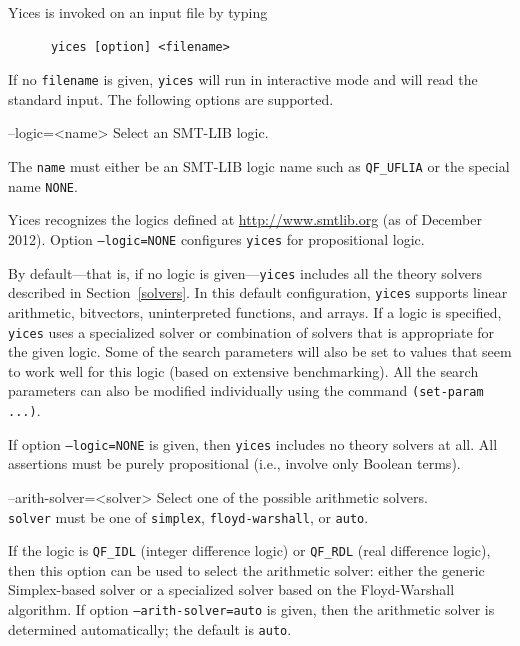 \documentclass[11pt,twoside,fleqn,openright,titlepage]{cslreport}
\newenvironment{options}{
\begin{list}{}{
\setlength{\labelsep}{1.8ex}
\setlength{\labelwidth}{0pt}
\setlength{\itemindent}{-0.5\leftmargin}
\settowidth{\leftmargin}{\texttt{--}}
\renewcommand{\makelabel}{\optionlabel}}}
{\end{list}}
\newcommand*\optionlabel[1]{\hspace\labelsep\texttt{#1}}
\begin{document}
Yices is invoked on an input file by typing
\begin{verbatim}
      yices [option] <filename>
\end{verbatim}
If no \texttt{filename} is given, \texttt{yices} will run in
interactive mode and will read the standard input. The following
options are supported.
\begin{options}
\item[--logic=<name>] Select an SMT-LIB logic.

  The \texttt{name} must either be an SMT-LIB logic name such as
  \texttt{QF\_UFLIA} or the special name \texttt{NONE}.

  Yices recognizes the logics defined at \url{http://www.smtlib.org}
  (as of December 2012).  Option \texttt{--logic=NONE} configures
  \texttt{yices} for propositional logic.

  By default---that is, if no logic is given---\texttt{yices} includes
  all the  theory solvers described in  Section~\ref{solvers}. In this
  default  configuration, \texttt{yices}  supports  linear arithmetic,
  bitvectors,  uninterpreted  functions, and  arrays.  If  a logic  is
  specified, \texttt{yices}  uses a specialized  solver or combination
  of  solvers that is  appropriate for  the given  logic. Some  of the
  search parameters will also be set  to values that seem to work well
  for  this logic (based  on extensive  benchmarking). All  the search
  parameters  can  also be  modified  individually  using the  command
  \texttt{(set-param ...)}.

  If  option  \texttt{--logic=NONE}   is  given,  then  \texttt{yices}
  includes no  theory solvers  at all. All  assertions must  be purely
  propositional (i.e., involve only Boolean terms).

\item[--arith-solver=<solver>] Select one of the possible arithmetic solvers.\\[1mm]
  \texttt{solver}     must    be     one     of    \texttt{simplex},
  \texttt{floyd-warshall}, or \texttt{auto}.

  If  the  logic is  \texttt{QF\_IDL}  (integer  difference logic)  or
  \texttt{QF\_RDL} (real  difference logic),  then this option  can be
  used   to  select   the  arithmetic   solver:  either   the  generic
  Simplex-based  solver   or  a   specialized  solver  based   on  the
  Floyd-Warshall algorithm.  If option \texttt{--arith-solver=auto} is
  given, then  the arithmetic solver is  determined automatically; the
  default is \texttt{auto}.


\end{options}
\end{document}
